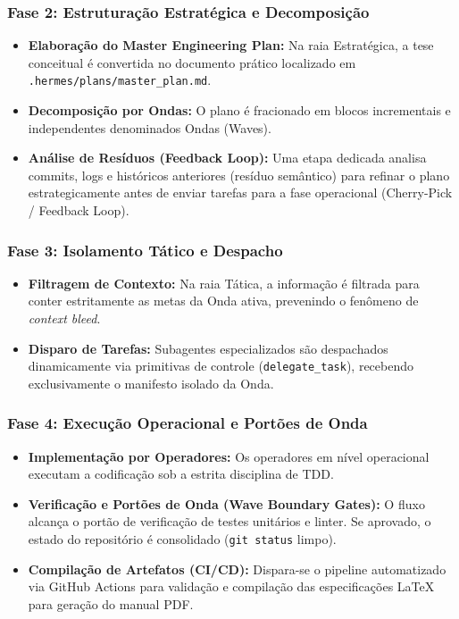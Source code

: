 \subsubsection{Fase 2: Estruturação Estratégica e Decomposição}
\begin{itemize}
    \item \textbf{Elaboração do Master Engineering Plan:} Na raia Estratégica, a tese conceitual é convertida no documento prático localizado em \texttt{.hermes/plans/master\_plan.md}.
    \item \textbf{Decomposição por Ondas:} O plano é fracionado em blocos incrementais e independentes denominados Ondas (Waves).
    \item \textbf{Análise de Resíduos (Feedback Loop):} Uma etapa dedicada analisa commits, logs e históricos anteriores (resíduo semântico) para refinar o plano estrategicamente antes de enviar tarefas para a fase operacional (Cherry-Pick / Feedback Loop).
\end{itemize}

\subsubsection{Fase 3: Isolamento Tático e Despacho}
\begin{itemize}
    \item \textbf{Filtragem de Contexto:} Na raia Tática, a informação é filtrada para conter estritamente as metas da Onda ativa, prevenindo o fenômeno de \emph{context bleed}.
    \item \textbf{Disparo de Tarefas:} Subagentes especializados são despachados dinamicamente via primitivas de controle (\texttt{delegate\_task}), recebendo exclusivamente o manifesto isolado da Onda.
\end{itemize}

\subsubsection{Fase 4: Execução Operacional e Portões de Onda}
\begin{itemize}
    \item \textbf{Implementação por Operadores:} Os operadores em nível operacional executam a codificação sob a estrita disciplina de TDD.
    \item \textbf{Verificação e Portões de Onda (Wave Boundary Gates):} O fluxo alcança o portão de verificação de testes unitários e linter. Se aprovado, o estado do repositório é consolidado (\texttt{git status} limpo).
    \item \textbf{Compilação de Artefatos (CI/CD):} Dispara-se o pipeline automatizado via GitHub Actions para validação e compilação das especificações LaTeX para geração do manual PDF.
\end{itemize}

